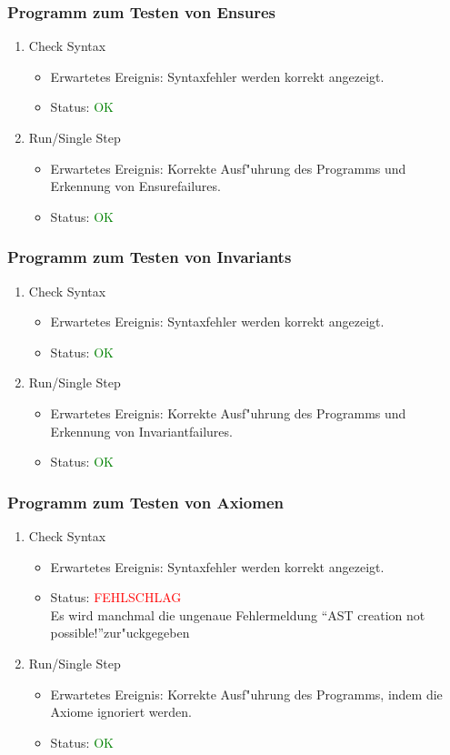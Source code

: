 \subsubsection{Programm zum Testen von Ensures}
\begin{enumerate}
\item Check Syntax
\begin{itemize}
\item Erwartetes Ereignis: Syntaxfehler werden korrekt angezeigt.
\item Status: \textcolor{green}{OK}
\end{itemize}
\item Run/Single Step
\begin{itemize}
\item Erwartetes Ereignis: Korrekte Ausf"uhrung des Programms und Erkennung von Ensurefailures.
\item Status: \textcolor{green}{OK}
\end{itemize}
\end{enumerate}
\subsubsection{Programm zum Testen von Invariants}
\begin{enumerate}
\item Check Syntax
\begin{itemize}
\item Erwartetes Ereignis: Syntaxfehler werden korrekt angezeigt.
\item Status: \textcolor{green}{OK}
\end{itemize}
\item Run/Single Step
\begin{itemize}
\item Erwartetes Ereignis: Korrekte Ausf"uhrung des Programms und Erkennung von Invariantfailures.
\item Status: \textcolor{green}{OK}
\end{itemize}
\end{enumerate}
\subsubsection{Programm zum Testen von Axiomen}
\begin{enumerate}
\item Check Syntax
\begin{itemize}
\item Erwartetes Ereignis: Syntaxfehler werden korrekt angezeigt.
\item Status: \textcolor{red}{FEHLSCHLAG} \\
Es wird manchmal die ungenaue Fehlermeldung "`AST creation not possible!"'zur"uckgegeben
\end{itemize}
\item Run/Single Step
\begin{itemize}
\item Erwartetes Ereignis: Korrekte Ausf"uhrung des Programms, indem die Axiome ignoriert werden.
\item Status: \textcolor{green}{OK}
\end{itemize}
\end{enumerate}
